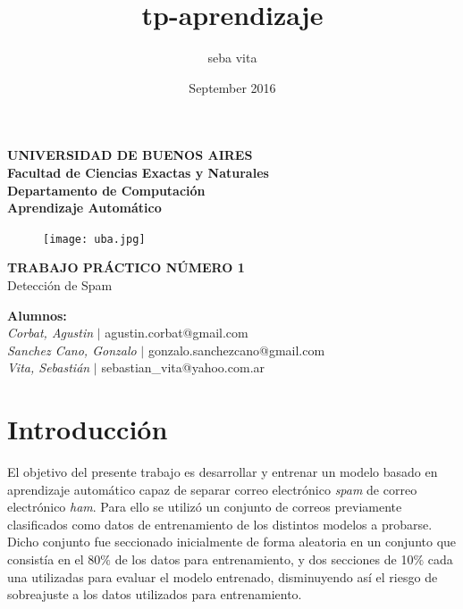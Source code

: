 \documentclass{article}
\title{tp-aprendizaje}
\author{seba vita}
\date{September 2016}
\begin{document}
\thispagestyle{empty}
\begin{center}

\Huge{ \bf{UNIVERSIDAD DE BUENOS AIRES}}
\\
\LARGE{\bf{Facultad de Ciencias Exactas y Naturales}}
\\
\textbf{Departamento de Computaci\'on}
\\
\textbf{Aprendizaje Automático}
\vspace{2.0\baselineskip}
\end{center}


\begin{figure}[H] %
\begin{center}
\texttt{[image: uba.jpg]}
\end{center}
\end{figure}
\begin{center}
\vspace*{0.5cm}

\huge{\bf TRABAJO PR\'ACTICO N\'UMERO 1}\\
\huge{Detección de Spam}
\vspace*{1.6cm}

\end{center}

\LARGE {\textbf{Alumnos:}}\\
\Large{\textsl{Corbat, Agustin} \hspace{1.59cm}$|$ agustin.corbat@gmail.com}\\
\Large{\textsl{Sanchez Cano, Gonzalo} $|$ gonzalo.sanchezcano@gmail.com}\\
\Large{\textsl{Vita, Sebasti\'an} \hspace{1.79cm}$|$ sebastian\_vita@yahoo.com.ar}
\vspace{0.6cm}



\vspace*{1cm}
 
\newpage


\section{Introducción}

El objetivo del presente trabajo es desarrollar y entrenar un modelo basado en aprendizaje automático capaz de separar correo electrónico \textit{spam} de correo electrónico \textit{ham}. Para ello se utilizó un conjunto de correos previamente clasificados como datos de entrenamiento de los distintos modelos a probarse. Dicho conjunto fue seccionado inicialmente de forma aleatoria en un conjunto que consistía en el 80$\%$ de los datos para entrenamiento, y dos secciones de 10$\%$ cada una utilizadas para evaluar el modelo entrenado, disminuyendo así el riesgo de sobreajuste a los datos utilizados para entrenamiento.
\end{document}
